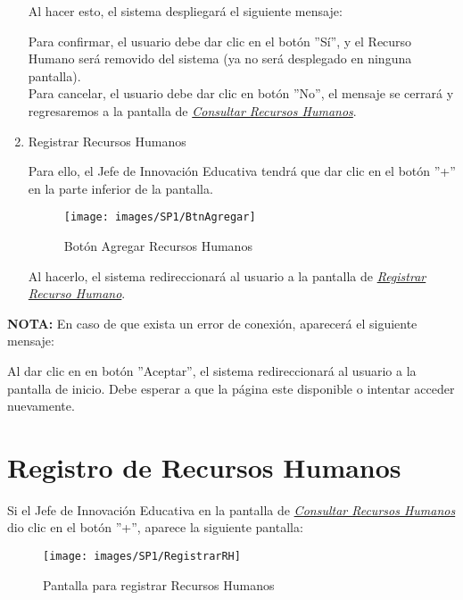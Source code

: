\begin{enumerate}
	Al hacer esto, el sistema despliegará el siguiente mensaje:

	Para confirmar, el usuario debe dar clic en el botón ''Sí'', y el Recurso Humano será removido del sistema (ya no será desplegado en ninguna pantalla).\\

	Para cancelar, el usuario debe dar clic en botón ''No'', el mensaje se cerrará y regresaremos a la pantalla de \hyperlink{consultarrh}{\textit{Consultar Recursos Humanos}}.\\

	\item Registrar Recursos Humanos

	Para ello, el Jefe de Innovación Educativa tendrá que dar clic en el botón ''+'' en la parte inferior de la pantalla.

	\begin{figure}[!hbtp]
		\centering
		\hypertarget{add}{\texttt{[image: images/SP1/BtnAgregar]}}
		\caption{Botón Agregar Recursos Humanos}
		\label{add}
	\end{figure}

	Al hacerlo, el sistema redireccionará al usuario a la pantalla de \hyperlink{registrarrh}{\textit{Registrar Recurso Humano}}.
\end{enumerate}

\textbf{NOTA:} En caso de que exista un error de conexión, aparecerá el siguiente mensaje:

Al dar clic en en botón ''Aceptar'', el sistema redireccionará al usuario a la pantalla de inicio. Debe esperar a que la página este disponible o intentar acceder nuevamente.

\newpage
\section{Registro de Recursos Humanos}
Si el Jefe de Innovación Educativa en la pantalla de \hyperlink{consultarrh}{\textit{Consultar Recursos Humanos}} dio clic en el botón ''+'', aparece la siguiente pantalla:

\begin{figure}[!hbtp]
	\centering
	\hypertarget{registrarrh}{\texttt{[image: images/SP1/RegistrarRH]}}
	\caption{Pantalla para registrar Recursos Humanos}
	\label{registrarrh}
\end{figure}

